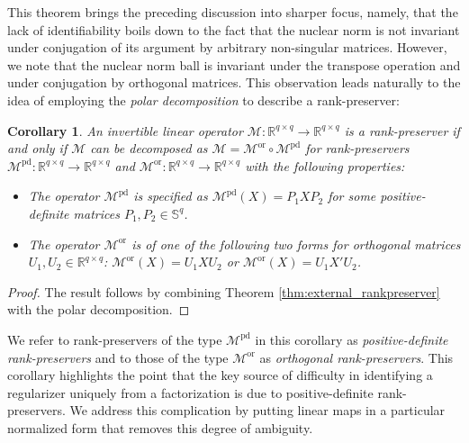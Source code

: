 \documentclass[11pt,letterpaper]{article}
\newtheorem{corollary}[theorem]{Corollary}
\newcommand{\R}{\mathbb{R}}
\renewcommand{\S}{\mathbb{S}}
\begin{document}
This theorem brings the preceding discussion into sharper focus, namely, that the lack of identifiability boils down to the fact that the nuclear norm is not invariant under conjugation of its argument by arbitrary non-singular matrices.  However, we note that the nuclear norm ball is invariant under the transpose operation and under conjugation by orthogonal matrices.  This observation leads naturally to the idea of employing the \emph{polar decomposition} to describe a rank-preserver:

\begin{corollary} \label{thm:external_rankpreserverpolardecomp}
An invertible linear operator $\mathcal{M}: \R^{q \times q} \rightarrow \R^{q \times q}$ is a rank-preserver if and only if $\mathcal{M}$ can be decomposed as $\mathcal{M} = \mathcal{M}^{\mathrm{or}} \circ \mathcal{M}^{\mathrm{pd}}$ for rank-preservers $\mathcal{M}^{\mathrm{pd}} : \R^{q \times q} \rightarrow \R^{q \times q}$ and $\mathcal{M}^{\mathrm{or}} : \R^{q \times q} \rightarrow \R^{q \times q}$ with the following properties:
\begin{itemize}
\item The operator $\mathcal{M}^{\mathrm{pd}}$ is specified as $\mathcal{M}^{\mathrm{pd}}(X) = P_1 X P_2$ for some positive-definite matrices $P_1, P_2 \in \S^q$.

\item The operator $\mathcal{M}^{\mathrm{or}}$ is of one of the following two forms for orthogonal matrices $U_1,U_2 \in \R^{q \times q}$: $\mathcal{M}^{\mathrm{or}}(X) = U_1 X U_2$ or $\mathcal{M}^{\mathrm{or}}(X) = U_1 X' U_2$.
\end{itemize}
\end{corollary}

\begin{proof}
The result follows by combining Theorem \ref{thm:external_rankpreserver} with the polar decomposition.
\end{proof}

We refer to rank-preservers of the type $\mathcal{M}^{\mathrm{pd}}$ in this corollary as \emph{positive-definite rank-preservers} and to those of the type $\mathcal{M}^{\mathrm{or}}$ as \emph{orthogonal rank-preservers}.  This corollary highlights the point that the key source of difficulty in identifying a regularizer uniquely from a factorization is due to positive-definite rank-preservers.  We address this complication by putting linear maps in a particular normalized form that removes this degree of ambiguity.
\end{document}
